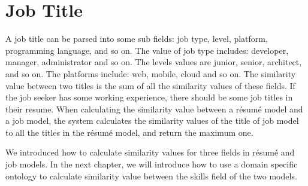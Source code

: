 \section{Job Title}

A job title can be parsed into some sub fields: job type, level, platform, programming language, and so on.  The value of job type includes: developer, manager, administrator and so on. The levels values are junior, senior, architect, and so on. The platforms include: web, mobile, cloud and so on. The similarity value between two titles is the sum of all the similarity values of these fields. If the job seeker has some working experience, there should be some job titles in their resume.  When calculating the similarity value between a r\'esum\'e model and a job model, the system calculates the similarity values of the title of job model to all the titles in the r\'esum\'e model, and return the maximum one.

We introduced how to calculate similarity values for three fields in r\'esum\'e and job models. In the next chapter, we will introduce how to use a domain specific ontology to calculate similarity value between the skills field of the two models.

